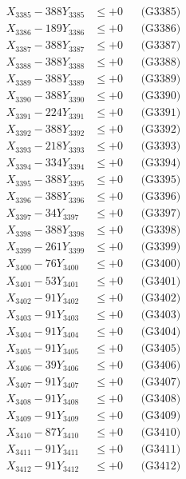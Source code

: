 \documentclass[a4paper,10pt]{article}
\begin{document}
{\begin{align}
X_{3385} - 388Y_{3385} &\leq +0 && \text{(G3385)} \\
X_{3386} - 189Y_{3386} &\leq +0 && \text{(G3386)} \\
X_{3387} - 388Y_{3387} &\leq +0 && \text{(G3387)} \\
X_{3388} - 388Y_{3388} &\leq +0 && \text{(G3388)} \\
X_{3389} - 388Y_{3389} &\leq +0 && \text{(G3389)} \\
X_{3390} - 388Y_{3390} &\leq +0 && \text{(G3390)} \\
\allowbreak
X_{3391} - 224Y_{3391} &\leq +0 && \text{(G3391)} \\
X_{3392} - 388Y_{3392} &\leq +0 && \text{(G3392)} \\
X_{3393} - 218Y_{3393} &\leq +0 && \text{(G3393)} \\
X_{3394} - 334Y_{3394} &\leq +0 && \text{(G3394)} \\
X_{3395} - 388Y_{3395} &\leq +0 && \text{(G3395)} \\
X_{3396} - 388Y_{3396} &\leq +0 && \text{(G3396)} \\
X_{3397} - 34Y_{3397} &\leq +0 && \text{(G3397)} \\
X_{3398} - 388Y_{3398} &\leq +0 && \text{(G3398)} \\
X_{3399} - 261Y_{3399} &\leq +0 && \text{(G3399)} \\
X_{3400} - 76Y_{3400} &\leq +0 && \text{(G3400)} \\
\allowbreak
X_{3401} - 53Y_{3401} &\leq +0 && \text{(G3401)} \\
X_{3402} - 91Y_{3402} &\leq +0 && \text{(G3402)} \\
X_{3403} - 91Y_{3403} &\leq +0 && \text{(G3403)} \\
X_{3404} - 91Y_{3404} &\leq +0 && \text{(G3404)} \\
X_{3405} - 91Y_{3405} &\leq +0 && \text{(G3405)} \\
X_{3406} - 39Y_{3406} &\leq +0 && \text{(G3406)} \\
X_{3407} - 91Y_{3407} &\leq +0 && \text{(G3407)} \\
X_{3408} - 91Y_{3408} &\leq +0 && \text{(G3408)} \\
X_{3409} - 91Y_{3409} &\leq +0 && \text{(G3409)} \\
X_{3410} - 87Y_{3410} &\leq +0 && \text{(G3410)} \\
\allowbreak
X_{3411} - 91Y_{3411} &\leq +0 && \text{(G3411)} \\
X_{3412} - 91Y_{3412} &\leq +0 && \text{(G3412)} \\

\end{align}}
\end{document}

